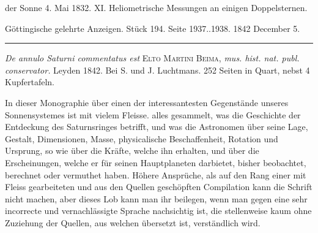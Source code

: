 der Sonne 4. Mai 1832. XI. Heliometrische Messungen an einigen Doppelsternen.

\clearpage
{}
\hypertarget{native-659-middle}{}
\begin{center}\small Göttingische gelehrte Anzeigen. Stück 194. Seite 1937..1938. 1842 December 5.\\[3pt]\rule{.72\linewidth}{.3pt}\end{center}

\emph{De annulo Saturni commentatus est} \textsc{Elto Martini Beima}, \emph{mus. hist. nat. publ. conservator.} Leyden 1842. Bei S. und J. Luchtmans. 252 Seiten in Quart, nebst 4 Kupfertafeln.

In dieser Monographie über einen der interessantesten Gegenstände unseres Sonnensystemes ist mit vielem Fleisse. alles gesammelt, was die Geschichte der Entdeckung des Saturnsringes betrifft, und was die Astronomen über seine Lage, Gestalt, Dimensionen, \textperiodcentered{}Masse, physicalische Beschaffenheit, Rotation und Ursprung, so wie über die Kräfte, welche ihn erhalten, und über die Erscheinungen, welche er für seinen Hauptplaneten darbietet, bisher beobachtet, berechnet oder vermuthet haben. Höhere Ansprüche, als auf den Rang einer mit Fleiss gearbeiteten und aus den Quellen geschöpften Compilation kann die Schrift nicht machen, aber dieses Lob kann man ihr beilegen, wenn man gegen eine sehr incorrecte und vernachlässigte Sprache nachsichtig ist, die stellenweise kaum ohne Zuziehung der Quellen, aus welchen übersetzt ist, verständlich wird.
